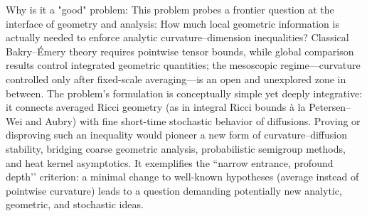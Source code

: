 Why is it a "good" problem:  
This problem probes a frontier question at the interface of geometry and analysis: How much local geometric information is actually needed to enforce analytic curvature–dimension inequalities?  Classical Bakry–Émery theory requires pointwise tensor bounds, while global comparison results control integrated geometric quantities; the mesoscopic regime—curvature controlled only after fixed-scale averaging—is an open and unexplored zone in between.  
The problem’s formulation is conceptually simple yet deeply integrative: it connects averaged Ricci geometry (as in integral Ricci bounds à la Petersen–Wei and Aubry) with fine short-time stochastic behavior of diffusions. Proving or disproving such an inequality would pioneer a new form of curvature–diffusion stability, bridging coarse geometric analysis, probabilistic semigroup methods, and heat kernel asymptotics.  
It exemplifies the “narrow entrance, profound depth’’ criterion: a minimal change to well-known hypotheses (average instead of pointwise curvature) leads to a question demanding potentially new analytic, geometric, and stochastic ideas.